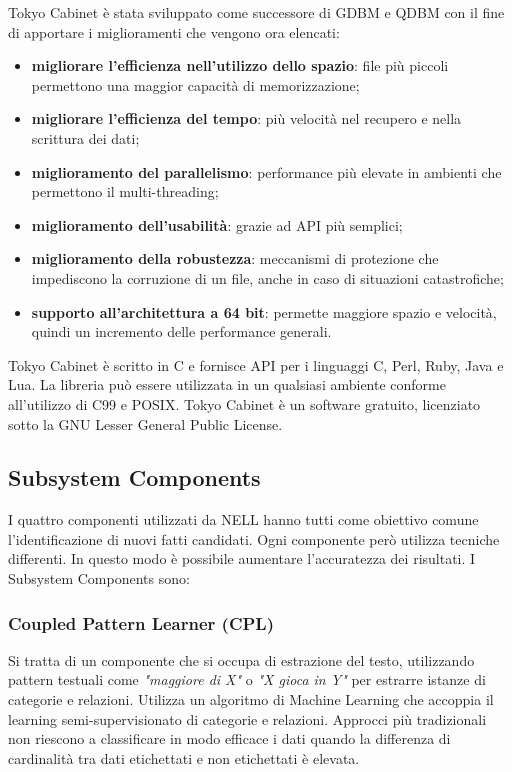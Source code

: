 
\noindent Tokyo Cabinet è stata sviluppato come successore di GDBM e QDBM con il fine di apportare i miglioramenti che vengono ora elencati:
\begin{itemize}
	\item \textbf{migliorare l'efficienza nell'utilizzo dello spazio}: file più piccoli permettono una maggior capacità di memorizzazione;
	\item \textbf{migliorare l'efficienza del tempo}: più velocità nel recupero e nella scrittura dei dati;
	\item \textbf{miglioramento del parallelismo}: performance più elevate in ambienti che permettono il multi-threading;
	\item \textbf{miglioramento dell'usabilità}: grazie ad API più semplici;
	\item \textbf{miglioramento della robustezza}: meccanismi di protezione che impediscono la corruzione di un file, anche in caso di situazioni catastrofiche;
	\item \textbf{supporto all'architettura a 64 bit}: permette maggiore spazio e velocità, quindi un incremento delle performance generali.
\end{itemize}

\noindent Tokyo Cabinet è scritto in C e fornisce API per i linguaggi C, Perl, Ruby, Java e Lua.
La libreria può essere utilizzata in un qualsiasi ambiente conforme all'utilizzo di C99 e POSIX. Tokyo Cabinet è un software gratuito, licenziato sotto la GNU Lesser General Public License\cite{TokyoCab61:online}.
\subsection{Subsystem Components}
I quattro componenti utilizzati da NELL hanno tutti come obiettivo comune l'identificazione di nuovi fatti candidati. Ogni componente però utilizza tecniche differenti. In questo modo è possibile aumentare l'accuratezza dei risultati. I Subsystem Components sono:
\subsubsection{Coupled Pattern Learner (CPL)}
Si tratta di un componente che si occupa di estrazione del testo, utilizzando pattern testuali come \textit{"maggiore di X"} o \textit{"X gioca in Y"} per estrarre istanze di categorie e relazioni. Utilizza un algoritmo di Machine Learning che accoppia il learning semi-supervisionato di categorie e relazioni. Approcci più tradizionali non riescono a classificare in modo efficace i dati quando la differenza di cardinalità tra dati etichettati e non etichettati è elevata.

